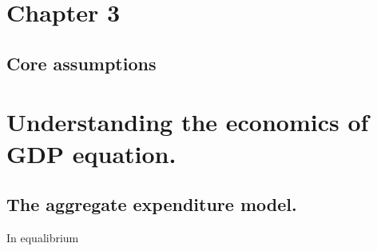\documentclass[twocolumn]{article}
\begin{document}
\hypertarget{chapter-3}{%
\section{Chapter 3}\label{chapter-3}}

\hypertarget{core-assumptions}{%
\subsection{Core assumptions}\label{core-assumptions}}

\hypertarget{section}{%
\subsection{}\label{section}}

\hypertarget{understanding-the-economics-of-gdp-equation.}{%
\section{Understanding the economics of GDP
equation.}\label{understanding-the-economics-of-gdp-equation.}}

\hypertarget{the-aggregate-expenditure-model.}{%
\subsection{The aggregate expenditure
model.}\label{the-aggregate-expenditure-model.}}

In equalibrium
\end{document}
